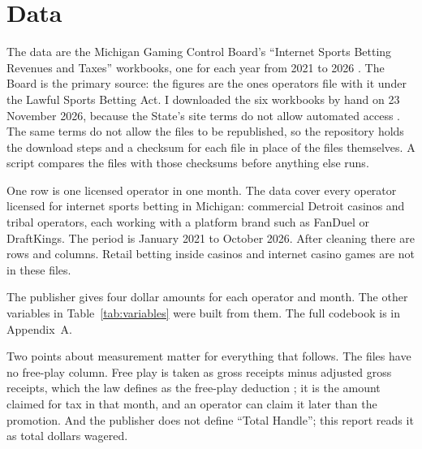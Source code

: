 \section{Data}\label{sec:data}

The data are the Michigan Gaming Control Board's ``Internet Sports Betting Revenues and Taxes'' workbooks, one for each year from 2021 to 2026 \cite{mgcb_data}. The Board is the primary source: the figures are the ones operators file with it under the Lawful Sports Betting Act. I downloaded the six workbooks by hand on 23 November 2026, because the State's site terms do not allow automated access \cite{migov_terms}. The same terms do not allow the files to be republished, so the repository holds the download steps and a checksum for each file in place of the files themselves. A script compares the files with those checksums before anything else runs.

One row is one licensed operator in one month. The data cover every operator licensed for internet sports betting in Michigan:  commercial Detroit casinos and  tribal operators, each working with a platform brand such as FanDuel or DraftKings. The period is January 2021 to October 2026. After cleaning there are  rows and  columns. Retail betting inside casinos and internet casino games are not in these files.

The publisher gives four dollar amounts for each operator and month. The other variables in Table~\ref{tab:variables} were built from them. The full codebook is in Appendix~A.

\begin{table}[H]
\centering\small
\caption{Key variables. Source: codebook (Appendix A).}\label{tab:variables}

\end{table}

Two points about measurement matter for everything that follows. The files have no free-play column. Free play is taken as gross receipts minus adjusted gross receipts, which the law defines as the free-play deduction \cite{mcl_403}; it is the amount claimed for tax in that month, and an operator can claim it later than the promotion. And the publisher does not define ``Total Handle''; this report reads it as total dollars wagered.
